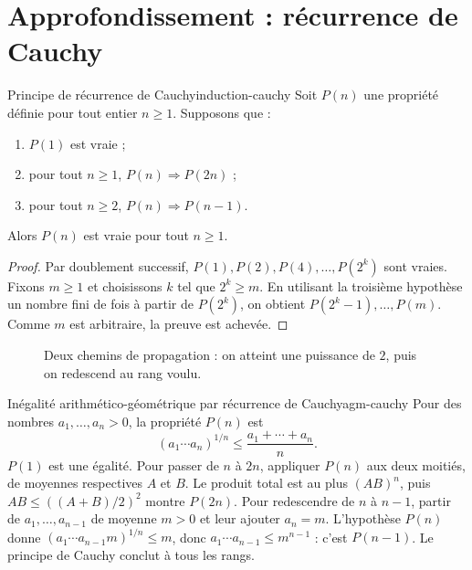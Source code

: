 \section{Approfondissement : récurrence de Cauchy}
\begin{theoreme}{Principe de récurrence de Cauchy}{induction-cauchy}
Soit $P(n)$ une propriété définie pour tout entier $n\ge1$. Supposons que :
\begin{enumerate}
 \item $P(1)$ est vraie ;
 \item pour tout $n\ge1$, $P(n)\Rightarrow P(2n)$ ;
 \item pour tout $n\ge2$, $P(n)\Rightarrow P(n-1)$.
\end{enumerate}
Alors $P(n)$ est vraie pour tout $n\ge1$.
\end{theoreme}
\begin{proof}
Par doublement successif, $P(1),P(2),P(4),\ldots,P(2^k)$ sont vraies.
Fixons $m\ge1$ et choisissons $k$ tel que $2^k\ge m$. En utilisant
la troisième hypothèse un nombre fini de fois à partir de $P(2^k)$,
on obtient $P(2^k-1),\ldots,P(m)$. Comme $m$ est arbitraire, la preuve est achevée.
\end{proof}
\begin{figure}[htbp]\centering
{}
\caption{Deux chemins de propagation : on atteint une puissance de $2$, puis on redescend au rang voulu.}
\end{figure}
\begin{exemple}{Inégalité arithmético-géométrique par récurrence de Cauchy}{agm-cauchy}
Pour des nombres $a_1,\ldots,a_n>0$, la propriété $P(n)$ est
\[
 (a_1\cdots a_n)^{1/n}\le\frac{a_1+\cdots+a_n}{n}.
\]
$P(1)$ est une égalité. Pour passer de $n$ à $2n$, appliquer $P(n)$ aux deux
moitiés, de moyennes respectives $A$ et $B$. Le produit total est au plus
$(AB)^n$, puis $AB\le((A+B)/2)^2$ montre $P(2n)$.
Pour redescendre de $n$ à $n-1$, partir de $a_1,\ldots,a_{n-1}$ de moyenne
$m>0$ et leur ajouter $a_n=m$. L'hypothèse $P(n)$ donne
$(a_1\cdots a_{n-1}m)^{1/n}\le m$, donc
$a_1\cdots a_{n-1}\le m^{n-1}$ : c'est $P(n-1)$.
Le principe de Cauchy conclut à tous les rangs.
\end{exemple}

